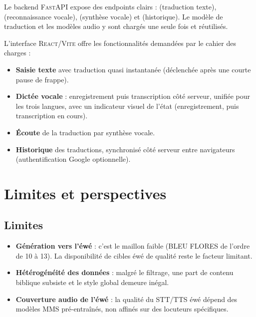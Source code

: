 \documentclass[11pt,a4paper]{article}
\begin{document}
Le backend \textsc{FastAPI} expose des endpoints clairs :  (traduction
texte),  (reconnaissance vocale),  (synthèse vocale)
et  (historique). Le modèle de traduction et les modèles audio y sont
chargés une seule fois et réutilisés.

L'interface \textsc{React}/\textsc{Vite} offre les fonctionnalités demandées par le
cahier des charges :

\begin{itemize}[leftmargin=1.5em,itemsep=3pt]
  \item \textbf{Saisie texte} avec traduction quasi instantanée (déclenchée après une
        courte pause de frappe).
  \item \textbf{Dictée vocale} : enregistrement puis transcription côté serveur, unifiée
        pour les trois langues, avec un indicateur visuel de l'état (enregistrement,
        puis transcription en cours).
  \item \textbf{Écoute} de la traduction par synthèse vocale.
  \item \textbf{Historique} des traductions, synchronisé côté serveur entre navigateurs
        (authentification Google optionnelle).
\end{itemize}

\section{Limites et perspectives}

\subsection{Limites}
\begin{itemize}[leftmargin=1.5em,itemsep=3pt]
  \item \textbf{Génération vers l'éwé} : c'est le maillon faible (BLEU FLORES de l'ordre
        de 10 à 13). La disponibilité de cibles éwé de qualité reste le facteur limitant.
  \item \textbf{Hétérogénéité des données} : malgré le filtrage, une part de contenu
        biblique subsiste et le style global demeure inégal.
  \item \textbf{Couverture audio de l'éwé} : la qualité du STT/TTS éwé dépend des modèles
        MMS pré-entraînés, non affinés sur des locuteurs spécifiques.
\end{itemize}
\end{document}
